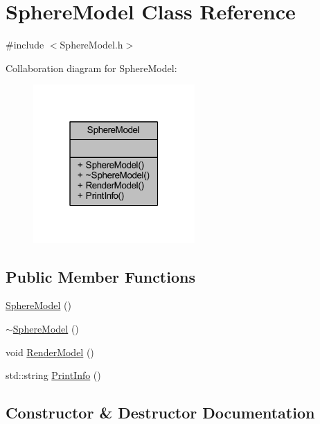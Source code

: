 \hypertarget{class_sphere_model}{}\section{Sphere\+Model Class Reference}
\label{class_sphere_model}


{\ttfamily \#include $<$Sphere\+Model.\+h$>$}



Collaboration diagram for Sphere\+Model\+:
\nopagebreak
\begin{figure}[H]
\begin{center}
\leavevmode
\includegraphics[width=175pt]{class_sphere_model__coll__graph}
\end{center}
\end{figure}
\subsection*{Public Member Functions}
\begin{DoxyCompactItemize}
\item 
\mbox{\hyperlink{class_sphere_model_a9442478e1ae463b984086c67e727f8a0}{Sphere\+Model}} ()
\item 
\mbox{\hyperlink{class_sphere_model_a7aefce5e0d8b54ffd42287b85b0e684c}{$\sim$\+Sphere\+Model}} ()
\item 
void \mbox{\hyperlink{class_sphere_model_a3ac469e318f16ff912f6c50e9304c2a3}{Render\+Model}} ()
\item 
std\+::string \mbox{\hyperlink{class_sphere_model_a55d41706d2e3f67bb0401d361cc4a426}{Print\+Info}} ()
\end{DoxyCompactItemize}


\subsection{Constructor \& Destructor Documentation}
\mbox{\label{class_sphere_model_a9442478e1ae463b984086c67e727f8a0}} 
